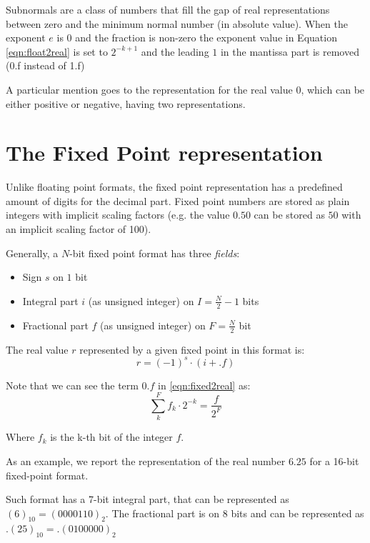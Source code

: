Subnormals are a class of numbers that fill the gap of real representations between zero and the minimum normal number (in absolute value). When the exponent $e$ is $0$ and the fraction is non-zero the exponent value in Equation \ref{eqn:float2real} is set to $2^{-k+1}$ and the leading $1$ in the mantissa part is removed (0.f instead of 1.f)

A particular mention goes to the representation for the real value $0$, which can be either positive or negative, having two representations.


\section{The Fixed Point representation}

Unlike floating point formats, the fixed point representation has a predefined amount of digits for the decimal part. Fixed point numbers are stored as plain integers with implicit scaling factors (e.g. the value $0.50$ can be stored as $50$ with an implicit scaling factor of 100).

Generally, a $N$-bit fixed point format has three \textit{fields}:

\begin{itemize}
    \item Sign $s$ on $1$ bit
    \item Integral part $i$ (as unsigned integer) on $I = \frac{N}{2} - 1$ bits
    \item Fractional part $f$ (as unsigned integer) on $F = \frac{N}{2}$ bit
\end{itemize}

The real value $r$ represented by a given fixed point in this format is:
\begin{equation}\label{eqn:fixed2real}
    r = (-1)^s \cdot \left( i + .f \right)
\end{equation}

Note that we can see the term $0.f$ in \eqref{eqn:fixed2real} as:
\[
    \sum_k^F f_k \cdot 2^{-k} = \frac{f}{2^F}
\]

Where $f_k$ is the k-th bit of the integer $f$.

As an example, we report the representation of the real number $6.25$ for a 16-bit fixed-point format.

Such format has a 7-bit integral part, that can be represented as $(6)_{10} = {(0000110)}_{2}$.
The fractional part is on 8 bits and can be represented as $ .(25)_{10} = .(0100000)_{2}$


